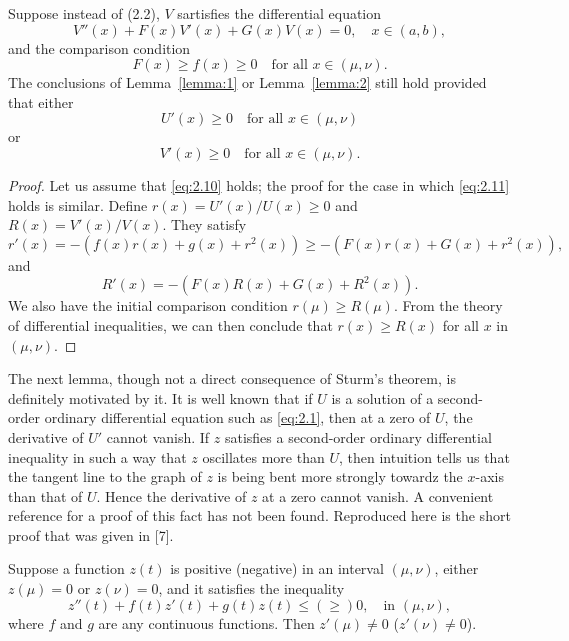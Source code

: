 \begin{lemma}\label{lemma:4}
  Suppose instead of (2.2), $V$ sartisfies the differential equation
  \begin{equation}\label{eq:2.8}
    V''(x) + F(x)V'(x) + G(x)V(x) = 0,\quad x\in (a,b),
  \end{equation}
  and the comparison condition
  \begin{equation}\label{eq:2.9}
    F(x) \geq f(x) \geq 0\quad \text{for all } x\in (\mu,\nu).
  \end{equation}
  The conclusions of Lemma~\ref{lemma:1} or Lemma~\ref{lemma:2}
  still hold provided that either
  \begin{equation}\label{eq:2.10}
    U'(x)\geq 0 \quad \text{for all } x\in (\mu,\nu)
  \end{equation}
  or
  \begin{equation}\label{eq:2.11}
    V'(x)\geq 0 \quad \text{for all } x\in (\mu,\nu).
  \end{equation}
\end{lemma}

\begin{proof}
  Let us assume that \eqref{eq:2.10} holds;
  the proof for the case in which \eqref{eq:2.11} holds is similar.
  Define $r(x) = U'(x)/U(x)\geq 0$ and $R(x) = V'(x)/V(x)$.
  They satisfy
  \[r'(x) = -(f(x)r(x)+g(x)+r^2(x)) \geq -(F(x)r(x)+G(x)+r^2(x)),\]
  and
  \[R'(x) = -(F(x)R(x)+G(x)+R^2(x)).\]
  We also have the initial comparison condition $r(\mu) \geq R(\mu)$.
  From the theory of differential inequalities, we can then conclude
  that $r(x)\geq R(x)$ for all $x$ in $(\mu,\nu)$.
\end{proof}

The next lemma, though not a direct consequence of Sturm's theorem,
is definitely motivated by it. It is well known that if $U$ is a solution
of a second-order ordinary differential equation such as \eqref{eq:2.1},
then at a zero of $U$, the derivative of $U'$ cannot vanish.
If $z$ satisfies a second-order ordinary differential inequality in such
a way that $z$ oscillates more than $U$,
then intuition tells us that the tangent line to the graph of $z$
is being bent more strongly towardz the $x$-axis than that of $U$.
Hence the derivative of $z$ at a zero cannot vanish.
A convenient reference for a proof of this fact has not been found.
Reproduced here is the short proof that was given in [7].

\begin{lemma}\label{lemma:5}
  Suppose a function $z(t)$ is positive (negative) in an interval
  $(\mu,\nu)$, either $z(\mu)=0$ or $z(\nu)=0$, and it satisfies
  the inequality
  \begin{equation}\label{eq:2.12}
    z''(t) + f(t)z'(t) + g(t)z(t) \leq (\geq ) 0,\quad \text{in }(\mu,\nu),
  \end{equation}
  where $f$ and $g$ are any continuous functions.
  Then $z'(\mu)\neq 0$ ($z'(\nu)\neq 0$).
\end{lemma}


